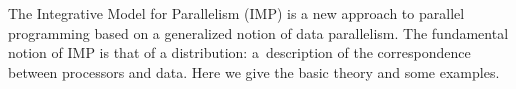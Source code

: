 The Integrative Model for Parallelism (IMP) is a new approach to
parallel programming based on a generalized notion of data parallelism.
The fundamental notion of IMP is that of a distribution:
a~description of the correspondence between processors and data.
Here we give the basic theory and some examples.
